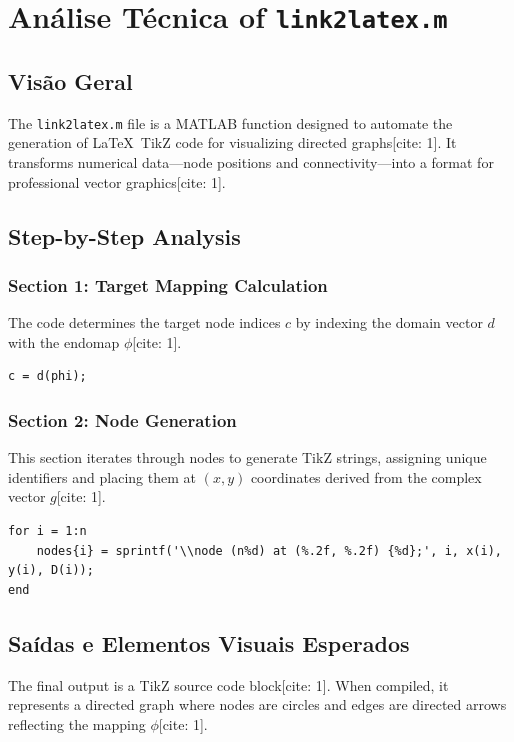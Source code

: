 
\chapter{Análise Técnica of \texttt{link2latex.m}}
\date{March 10, 2026}

\section{Visão Geral}
The \texttt{link2latex.m} file is a MATLAB function designed to automate the generation of \LaTeX\ TikZ code for visualizing directed graphs[cite: 1]. It transforms numerical data—node positions and connectivity—into a format for professional vector graphics[cite: 1].

\section{Step-by-Step Analysis}

\subsection{Section 1: Target Mapping Calculation}
The code determines the target node indices $c$ by indexing the domain vector $d$ with the endomap $\phi$[cite: 1].
\begin{lstlisting}
c = d(phi);
\end{lstlisting}

\subsection{Section 2: Node Generation}
This section iterates through nodes to generate TikZ strings, assigning unique identifiers and placing them at $(x, y)$ coordinates derived from the complex vector $g$[cite: 1].
\begin{lstlisting}
for i = 1:n
    nodes{i} = sprintf('\\node (n%d) at (%.2f, %.2f) {%d};', i, x(i), y(i), D(i));
end
\end{lstlisting}

\section{Saídas e Elementos Visuais Esperados}
The final output is a TikZ source code block[cite: 1]. When compiled, it represents a directed graph where nodes are circles and edges are directed arrows reflecting the mapping $\phi$[cite: 1].
